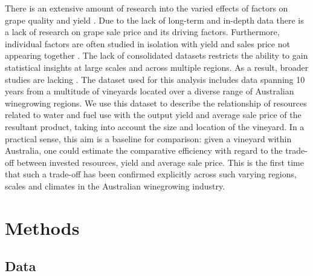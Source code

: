 \documentclass[review,12pt,authoryear]{elsarticle}
\begin{document}
\begin{linenumbers}
There is an extensive amount of research into the varied effects of factors on grape quality and yield \citep{heFruitYieldPrediction2022,laurentLocalInfluenceClimate2022,liakosMachineLearningAgriculture2018}. Due to the lack of long-term and in-depth data there is a lack of research on grape sale price and its driving factors. Furthermore, individual factors are often studied in isolation with yield and sales price not appearing together \citep{abbalDecisionSupportSystem2016}. The lack of consolidated datasets restricts the ability to gain statistical insights at large scales and across multiple regions. As a result, broader studies are lacking \citep{keithjonesAustralianWineIndustry2002,knightFirmResourcesDevelopment2019}. The dataset used for this analysis includes data spanning 10 years from a multitude of vineyards located over a diverse range of Australian winegrowing regions. We use this dataset to describe the relationship of resources related to water and fuel use with the output yield and average sale price of the resultant product, taking into account the size and location of the vineyard. In a practical sense, this aim is a baseline for comparison: given a vineyard within Australia, one could estimate the comparative efficiency with regard to the trade-off between invested resources, yield and average sale price. This is the first time that such a trade-off has been confirmed explicitly across such varying regions, scales and climates in the Australian winegrowing industry.
\section{Methods}
\subsection{Data}


\end{linenumbers}
\end{document}
